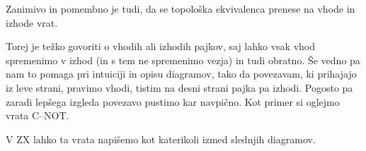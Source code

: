 \documentclass[mat1]{fmfdelo}
\begin{document}
Zanimivo in pomembno je tudi, da se topološka ekvivalenca prenese na vhode in izhode vrat.
\begin{center}
\end{center}
Torej je težko govoriti o vhodih ali izhodih pajkov, saj lahko vsak vhod spremenimo v izhod (in s tem ne spremenimo vezja) in tudi obratno. Še vedno pa nam to pomaga pri intuiciji in opisu diagramov, tako da povezavam, ki prihajajo iz leve strani, pravimo vhodi, tistim na desni strani pajka pa izhodi. Pogosto pa zaradi lepšega izgleda povezavo pustimo kar navpično. Kot primer si oglejmo vrata C--NOT. 
\begin{center}
\end{center}
V ZX lahko ta vrata napišemo kot katerikoli izmed slednjih diagramov.
\end{document}
